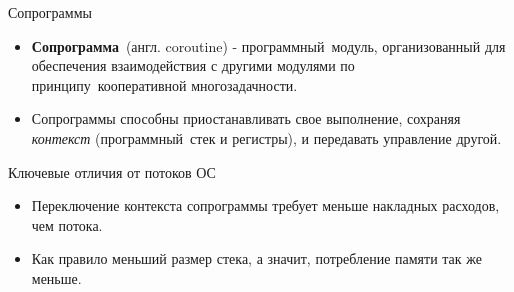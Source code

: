 \begin{frame}{Сопрограммы}
	\begin{itemize}
		\item \textbf{Сопрограмма} (англ. coroutine) - программный модуль, организованный для обеспечения взаимодействия с другими модулями по принципу кооперативной многозадачности.
		
		\item Сопрограммы способны приостанавливать свое выполнение, сохраняя \textit{контекст} 
		(программный стек и регистры), и передавать управление другой.
	\end{itemize}
\end{frame}

\begin{frame}{Ключевые отличия от потоков ОС}
	\begin{itemize}
		\item Переключение контекста сопрограммы требует меньше накладных расходов, чем потока.
		\item Как правило меньший размер стека, а значит, потребление памяти так же меньше.
	\end{itemize}
\end{frame}


